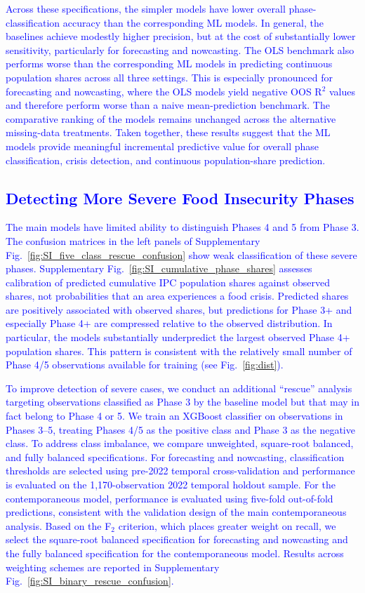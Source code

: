 \documentclass[pdflatex,sn-mathphys-num]{sn-jnl}%
\theoremstyle{thmstyleone}%
\theoremstyle{thmstyletwo}%
\theoremstyle{thmstylethree}%
\begin{document}
\textcolor{blue}{Across these specifications, the simpler models have lower overall phase-classification accuracy than the corresponding ML models. In general, the baselines achieve modestly higher precision, but at the cost of substantially lower sensitivity, particularly for forecasting and nowcasting. The OLS benchmark also performs worse than the corresponding ML models in predicting continuous population shares across all three settings. This is especially pronounced for forecasting and nowcasting, where the OLS models yield negative OOS R$^2$ values and therefore perform worse than a naive mean-prediction benchmark. The comparative ranking of the models remains unchanged across the alternative missing-data treatments. Taken together, these results suggest that the ML models provide meaningful incremental predictive value for overall phase classification, crisis detection, and continuous population-share prediction.}

\subsection*{\textcolor{blue}{Detecting More Severe Food Insecurity Phases}}

\textcolor{blue}{The main models have limited ability to distinguish Phases 4 and 5 from Phase 3. The confusion matrices in the left panels of Supplementary Fig.~\ref{fig:SI_five_class_rescue_confusion} show weak classification of these severe phases. Supplementary Fig.~\ref{fig:SI_cumulative_phase_shares} assesses calibration of predicted cumulative IPC population shares against observed shares, not probabilities that an area experiences a food crisis. Predicted shares are positively associated with observed shares, but predictions for Phase 3+ and especially Phase 4+ are compressed relative to the observed distribution. In particular, the models substantially underpredict the largest observed Phase 4+ population shares. This pattern is consistent with the relatively small number of Phase 4/5 observations available for training (see Fig.~\ref{fig:dist}).}

\textcolor{blue}{To improve detection of severe cases, we conduct an additional ``rescue'' analysis targeting observations classified as Phase 3 by the baseline model but that may in fact belong to Phase 4 or 5. We train an XGBoost classifier on observations in Phases 3--5, treating Phases 4/5 as the positive class and Phase 3 as the negative class. To address class imbalance, we compare unweighted, square-root balanced, and fully balanced specifications. For forecasting and nowcasting, classification thresholds are selected using pre-2022 temporal cross-validation and performance is evaluated on the 1,170-observation 2022 temporal holdout sample. For the contemporaneous model, performance is evaluated using five-fold out-of-fold predictions, consistent with the validation design of the main contemporaneous analysis. Based on the F$_2$ criterion, which places greater weight on recall, we select the square-root balanced specification for forecasting and nowcasting and the fully balanced specification for the contemporaneous model. Results across weighting schemes are reported in Supplementary Fig.~\ref{fig:SI_binary_rescue_confusion}.}
\end{document}
